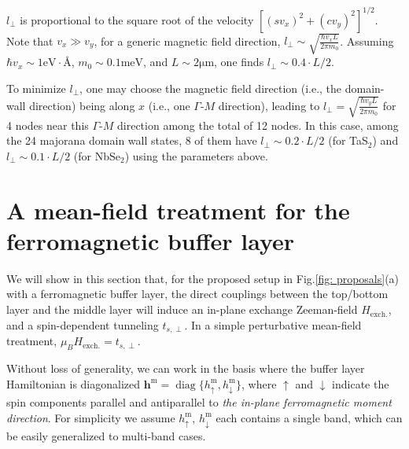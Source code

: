 \begin{subappendices}
	$l_\perp$ is proportional to the square root of the velocity $[(sv_x)^2+(cv_y)^2]^{1/2}$. Note that $v_x\gg v_y$, for a generic magnetic field direction, $l_\perp\sim \sqrt{\frac{\hbar v_x L}{2\pi m_0}}$. Assuming $\hbar v_x\sim 1\mathrm{eV}\cdot\text{\AA}$, $m_0\sim 0.1\mathrm{meV}$, and $L\sim 2\mathrm{\mu m}$, one finds $l_\perp\sim 0.4\cdot L/2$.
	
    To minimize $l_\perp$, one may choose the magnetic field direction (i.e., the domain-wall direction) being along $x$ (i.e., one $\Gamma$-$M$ direction), leading to $l_\perp=\sqrt{\frac{\hbar v_y L}{2\pi m_0}}$ for 4 nodes near this $\Gamma$-$M$ direction among the total of 12 nodes. In this case, among the 24 majorana domain wall states, 8 of them have $l_\perp\sim 0.2\cdot L/2$ (for TaS$_2$) and $l_\perp\sim 0.1\cdot L/2$ (for NbSe$_2$) using the parameters above. 

\section{A mean-field treatment for the ferromagnetic buffer layer}\label{app:magnetic_buffer_layer_perturbation}
	We will show in this section that, for the proposed setup in Fig.\ref{fig: proposals}(a) with a ferromagnetic buffer layer, the direct couplings between the top/bottom layer and the middle layer will induce an in-plane exchange Zeeman-field $H_{\text{exch.}}$, and a spin-dependent tunneling $t_{s,\perp}$. In a simple perturbative mean-field treatment, $\mu_B H_{\text{exch.}}=t_{s,\perp}$.
	
	
	Without loss of generality, we can work in the basis where the buffer layer Hamiltonian is diagonalized $\bm{h}^\text{m}=\mathop{\mathrm{diag}}\{h^{\text{m}}_\uparrow, h^\text{m}_\downarrow\}$, where $\uparrow$ and $\downarrow$ indicate the spin components parallel and antiparallel to \emph{the in-plane ferromagnetic moment direction}. For simplicity we assume $h^{\text{m}}_\uparrow$, $h^{\text{m}}_\downarrow$ each contains a single band, which can be easily generalized to multi-band cases.
	

\end{subappendices}
